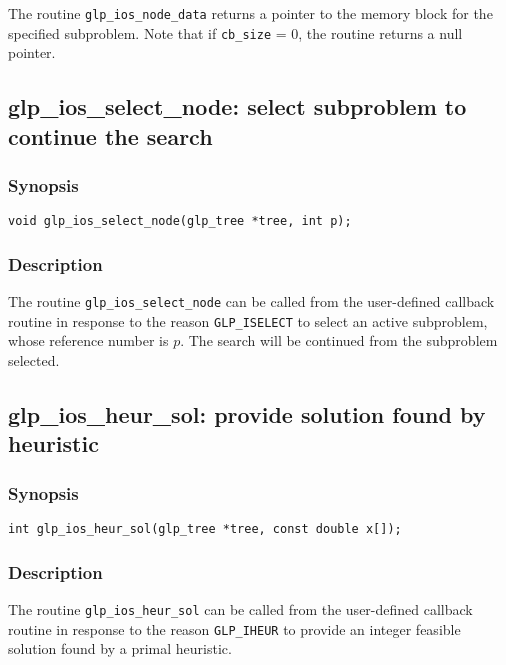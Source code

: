 The routine \verb|glp_ios_node_data| returns a pointer to the memory
block for the specified subproblem. Note that if \verb|cb_size| = 0, the
routine returns a null pointer.

\subsection{glp\_ios\_select\_node: select subproblem to continue the
search}

\subsubsection*{Synopsis}

\begin{verbatim}
void glp_ios_select_node(glp_tree *tree, int p);
\end{verbatim}

\subsubsection*{Description}

The routine \verb|glp_ios_select_node| can be called from the
user-defined callback routine in response to the reason
\verb|GLP_ISELECT| to select an active subproblem, whose reference
number is $p$. The search will be continued from the subproblem
selected.

\newpage

\subsection{glp\_ios\_heur\_sol: provide solution found by heuristic}

\subsubsection*{Synopsis}

\begin{verbatim}
int glp_ios_heur_sol(glp_tree *tree, const double x[]);
\end{verbatim}

\subsubsection*{Description}

The routine \verb|glp_ios_heur_sol| can be called from the user-defined
callback routine in response to the reason \verb|GLP_IHEUR| to provide
an integer feasible solution found by a primal heuristic.

